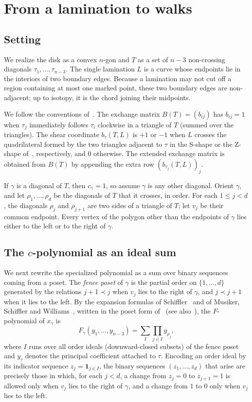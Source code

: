 \documentclass[11pt]{amsart}
\theoremstyle{remark}
\numberwithin{equation}{section}
\begin{document}
\section{From a lamination to walks}\label{sec:lamination}

\subsection{Setting}
We realize the disk as a convex $n$-gon and $T$ as a set of $n-3$ non-crossing
diagonals $\tau_1,\dots,\tau_{n-3}$. The single lamination $L$ is a curve whose
endpoints lie in the interiors of two boundary edges. Because a lamination may
not cut off a region containing at most one marked point, these two boundary
edges are non-adjacent; up to isotopy, it is the chord joining their midpoints.

We follow the conventions of~\cite[Section~2]{KLL}. The exchange matrix
$B(T)=(b_{ij})$ has $b_{ij}=1$ when $\tau_j$ immediately follows $\tau_i$
clockwise in a triangle of $T$ (summed over the triangles). The shear
coordinate $b_{\tau}(T,L)$ is $+1$ or $-1$ when $L$ crosses the quadrilateral
formed by the two triangles adjacent to $\tau$ in the S-shape or the Z-shape
of~\cite[Figure~3]{KLL}, respectively, and $0$ otherwise. The extended exchange
matrix is obtained from $B(T)$ by appending the extra row $(b_{\tau_j}(T,L))_j$.

If $\gamma$ is a diagonal of $T$, then $c_\gamma=1$, so assume $\gamma$ is any
other diagonal. Orient $\gamma$, and let $\rho_1,\dots,\rho_d$ be the diagonals
of $T$ that it crosses, in order. For each $1\le j<d$, the diagonals $\rho_j$
and $\rho_{j+1}$ are two sides of a triangle of $T$; let $v_j$ be their common
endpoint. Every vertex of the polygon other than the endpoints of $\gamma$ lies
either to the left or to the right of $\gamma$.

\subsection{The \texorpdfstring{$c$}{c}-polynomial as an ideal sum}
We next rewrite the specialized polynomial as a sum over binary sequences
coming from a poset. The \emph{fence poset} of $\gamma$ is the partial order on
$\{1,\dots,d\}$ generated by the relations $j+1\prec j$ when $v_j$ lies to the
right of $\gamma$, and $j\prec j+1$ when it lies to the left. By the expansion
formulas of Schiffler~\cite{Sch} and of Musiker, Schiffler and
Williams~\cite{MSW}, written in the poset form of~\cite[Section~3.2]{KLL} (see
also~\cite{PRS}), the $F$-polynomial of $x_\gamma$ is
\[
F_\gamma(y_1,\dots,y_{n-3})=\sum_{I}\prod_{j\in I}y_{\rho_j},
\]
where $I$ runs over all order ideals (downward-closed subsets) of the fence
poset and $y_\tau$ denotes the principal coefficient attached to $\tau$.
Encoding an order ideal by its indicator sequence $z_j=\mathbf 1_{j\in I}$, the
binary sequences $(z_1,\dots,z_d)$ that arise are precisely those in which, for
each $j<d$, a change from $z_j=0$ to $z_{j+1}=1$ is allowed only when $v_j$
lies to the right of $\gamma$, and a change from $1$ to $0$ only when $v_j$
lies to the left.
\end{document}
